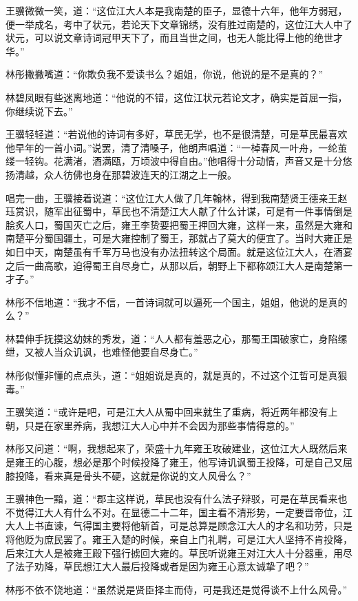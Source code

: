 王骥微微一笑，道：“这位江大人本是我南楚的臣子，显德十六年，他年方弱冠，便一举成名，考中了状元，若论天下文章锦绣，没有胜过南楚的，这位江大人中了状元，可以说文章诗词冠甲天下了，而且当世之间，也无人能比得上他的绝世才华。”

林彤撇撇嘴道：“你欺负我不爱读书么？姐姐，你说，他说的是不是真的？”

林碧凤眼有些迷离地道：“他说的不错，这位江状元若论文才，确实是首屈一指，你继续说下去。”

王骥轻轻道：“若说他的诗词有多好，草民无学，也不是很清楚，可是草民最喜欢他早年的一首小词。”说罢，清了清嗓子，他朗声唱道：“一棹春风一叶舟，一纶茧缕一轻钩。花满渚，酒满瓯，万顷波中得自由。”他唱得十分动情，声音又是十分悠扬清越，众人彷佛也身在那碧波连天的江湖之上一般。

唱完一曲，王骥接着说道：“这位江大人做了几年翰林，得到我南楚贤王德亲王赵珏赏识，随军出征蜀中，草民也不清楚江大人献了什么计谋，可是有一件事情倒是脍炙人口，蜀国灭亡之后，雍王李贽要把蜀王押回大雍，这样一来，虽然是大雍和南楚平分蜀国疆土，可是大雍控制了蜀王，那就占了莫大的便宜了。当时大雍正是如日中天，南楚虽有千军万马也没有办法扭转这个局面。就是这位江大人，在酒宴之后一曲高歌，迫得蜀王自尽身亡，从那以后，朝野上下都称颂江大人是南楚第一才子。”

林彤不信地道：“我才不信，一首诗词就可以逼死一个国主，姐姐，他说的是真的么？”

林碧伸手抚摸这幼妹的秀发，道：“人人都有羞恶之心，那蜀王国破家亡，身陷缧绁，又被人当众讥讽，也难怪他要自尽身亡。”

林彤似懂非懂的点点头，道：“姐姐说是真的，就是真的，不过这个江哲可是真狠毒。”

王骥笑道：“或许是吧，可是江大人从蜀中回来就生了重病，将近两年都没有上朝，只是在家里养病，我想江大人心中并不会因为那些事情得意的。”

林彤又问道：“啊，我想起来了，荣盛十九年雍王攻破建业，这位江大人既然后来是雍王的心腹，想必是那个时候投降了雍王，他写诗讥讽蜀王投降，可是自己又屈膝投降，看来真是骨头不硬，这就是你说的文人风骨么？”

王骥神色一黯，道：“郡主这样说，草民也没有什么法子辩驳，可是在草民看来也不觉得江大人有什么不对。在显德二十二年，国主看不清形势，一定要晋帝位，江大人上书直谏，气得国主要将他斩首，可是总算是顾念江大人的才名和功劳，只是将他贬为庶民罢了。雍王入楚的时候，亲自上门礼聘，可是江大人坚持不肯投降，后来江大人是被雍王殿下强行掳回大雍的。草民听说雍王对江大人十分器重，用尽了法子劝降，草民想江大人最后投降或者是因为雍王心意太诚挚了吧？”

林彤不依不饶地道：“虽然说是贤臣择主而侍，可是我还是觉得谈不上什么风骨。”

